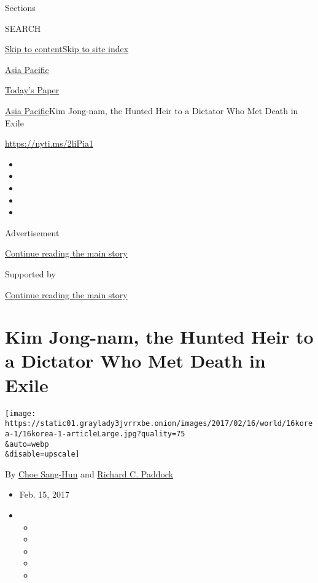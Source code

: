 Sections

SEARCH

\protect\hyperlink{site-content}{Skip to
content}\protect\hyperlink{site-index}{Skip to site index}

\href{https://www.nytimes3xbfgragh.onion/section/world/asia}{Asia
Pacific}

\href{https://myaccount.nytimes3xbfgragh.onion/auth/login?response_type=cookie\&client_id=vi}{}

\href{https://www.nytimes3xbfgragh.onion/section/todayspaper}{Today's
Paper}

\href{/section/world/asia}{Asia Pacific}\textbar{}Kim Jong-nam, the
Hunted Heir to a Dictator Who Met Death in Exile

\url{https://nyti.ms/2liPia1}

\begin{itemize}
\item
\item
\item
\item
\item
\end{itemize}

Advertisement

\protect\hyperlink{after-top}{Continue reading the main story}

Supported by

\protect\hyperlink{after-sponsor}{Continue reading the main story}

\hypertarget{kim-jong-nam-the-hunted-heir-to-a-dictator-who-met-death-in-exile}{%
\section{Kim Jong-nam, the Hunted Heir to a Dictator Who Met Death in
Exile}\label{kim-jong-nam-the-hunted-heir-to-a-dictator-who-met-death-in-exile}}

\texttt{[image: https://static01.graylady3jvrrxbe.onion/images/2017/02/16/world/16korea-1/16korea-1-articleLarge.jpg?quality=75\\\&auto=webp\\\&disable=upscale]}

By \href{http://www.nytimes3xbfgragh.onion/by/choe-sang-hun}{Choe
Sang-Hun} and
\href{https://www.nytimes3xbfgragh.onion/by/richard-c-paddock}{Richard
C. Paddock}

\begin{itemize}
\item
  Feb. 15, 2017
\item
  \begin{itemize}
  \item
  \item
  \item
  \item
  \item
  \end{itemize}
\end{itemize}

